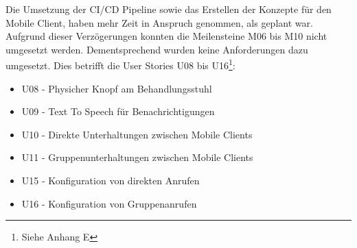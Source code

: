 Die Umsetzung der CI/CD Pipeline sowie das Erstellen der Konzepte für den Mobile Client, haben mehr Zeit in Anspruch genommen, als geplant war.
Aufgrund dieser Verzögerungen konnten die Meilensteine M06 bis M10 nicht umgesetzt werden.
Dementsprechend wurden keine Anforderungen dazu umgesetzt.
Dies betrifft die User Stories U08 bis U16\footnote{Siehe Anhang E}:

\begin{itemize}
    \item U08 - Physicher Knopf am Behandlungsstuhl
    \item U09 - Text To Speech für Benachrichtigungen
    \item U10 - Direkte Unterhaltungen zwischen Mobile Clients
    \item U11 - Gruppenunterhaltungen zwischen Mobile Clients
    \item U15 - Konfiguration von direkten Anrufen
    \item U16 - Konfiguration von Gruppenanrufen
\end{itemize}

\clearpage
